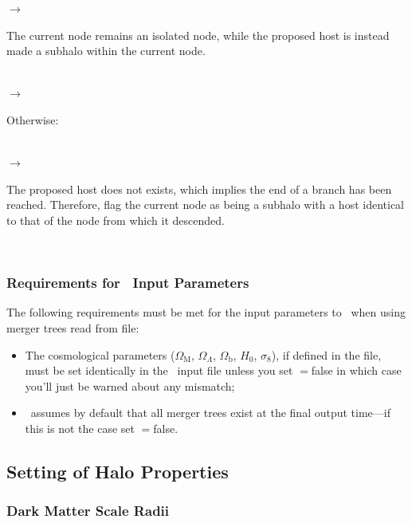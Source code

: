 \begin{itemize}
\noindent\hspace{30mm} $\rightarrow$ \parbox[t]{125mm}{The current node remains an isolated node, while the proposed host is instead made a subhalo within the current node.}\\

\noindent\hspace{20mm} $\rightarrow$ \parbox[t]{135mm}{Otherwise:}\\

\noindent\hspace{25mm} $\rightarrow$ \parbox[t]{130mm}{The proposed host does not exists, which implies the end of a branch has been reached. Therefore, flag the current node as being a subhalo with a host identical to that of the node from which it descended.}\\
\end{itemize}

\subsubsection{Requirements for \glc\ Input Parameters}

The following requirements must be met for the input parameters to \glc\ when using merger trees read from file:
\begin{itemize}
 \item The cosmological parameters ($\Omega_\mathrm{M}$, $\Omega_\Lambda$, $\Omega_\mathrm{b}$, $H_0$, $\sigma_8$), if defined in the file, must be set identically in the \glc\ input file unless you set {\normalfont \ttfamily [mergerTreeReadMismatchIsFatal]}$=${\normalfont \ttfamily false} in which case you'll just be warned about any mismatch;
 \item \glc\ assumes by default that all merger trees exist at the final output time---if this is not the case set {\normalfont \ttfamily [allTreesExistAtFinalTime]}$=${\normalfont \ttfamily false}.
\end{itemize}

\subsection{Setting of Halo Properties}

\subsubsection{Dark Matter Scale Radii}

